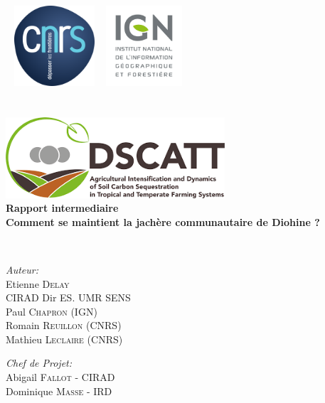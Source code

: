 \begin{titlepage}
\begin{center}

\logoCirad ~ \includegraphics[height=30mm]{./logo/cnrs.png} ~ \includegraphics[height=30mm]{./logo/ign.png}\\[6cm]


\textsc{\Large }\\[0.5cm]

\HRule \\[0.4cm]
\includegraphics[height=30mm]{./logo/DSCATT.png}\\
{\huge \bfseries Rapport intermediaire \\
 Comment se maintient la jachère communautaire de Diohine ? \\[0.4cm] }

\HRule \\[1.5cm]


\begin{minipage}{0.4\textwidth}
\begin{flushleft} \large
\emph{\textcolor{gris}{Auteur:}}\\
Etienne \textsc{Delay}\\
\textcolor{vert}{CIRAD Dir ES. UMR SENS}\\
Paul \textsc{Chapron} (IGN)\\
Romain \textsc{Reuillon} (CNRS)\\
Mathieu \textsc{Leclaire} (CNRS)
\end{flushleft}
\end{minipage}
\begin{minipage}{0.4\textwidth}
\begin{flushright} \large
\emph{\textcolor{gris}{Chef de Projet:}} \\
Abigail \textsc{Fallot} - CIRAD\\
Dominique \textsc{Masse} - IRD
\end{flushright}
\end{minipage}


\end{center}
\end{titlepage}
